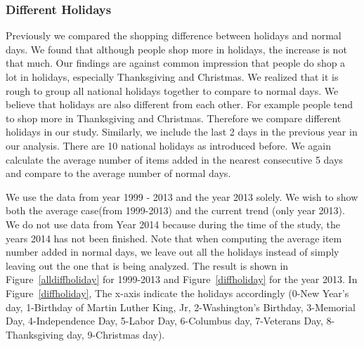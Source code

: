 \documentclass{llncs}
\begin{document}
\subsubsection{Different Holidays}
Previously we compared the shopping difference between holidays and normal days. We found that although people shop more in holidays, the increase is not that much. Our findings are against common impression that people do shop a lot in holidays, especially Thanksgiving and Christmas. We realized that it is rough to group all national holidays together to compare to normal days. We believe that holidays are also different from each other. For example people tend to shop more in Thanksgiving and Christmas. Therefore we compare different holidays in our study. Similarly, we include the last 2 days in the previous year in our analysis. There are 10 national holidays as introduced before. We again calculate the average number of items added in the nearest consecutive 5 days and compare to the average number of normal days. 

We use the data from year 1999 - 2013 and the year 2013 solely. We wish to show both the average case(from 1999-2013) and the current trend (only year 2013). We do not use data from Year 2014 because during the time of the study, the years 2014 has not been finished. Note that when computing the average item number added in normal days, we leave out all the holidays instead of simply leaving out the one that is being analyzed. The result is shown in Figure~\ref{alldiffholiday} for 1999-2013 and Figure~\ref{diffholiday} for the year 2013. In Figure~\ref{diffholiday}, The x-axis indicate the holidays accordingly (0-New Year's day, 1-Birthday of Martin Luther King, Jr, 2-Washington's Birthday, 3-Memorial Day, 4-Independence Day, 5-Labor Day, 6-Columbus day, 7-Veterans Day, 8-Thanksgiving day, 9-Christmas day).
\end{document}
